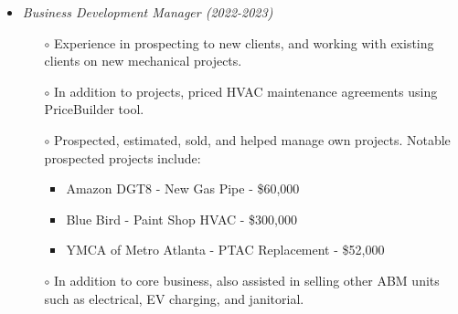 \documentclass[margin]{res}
\begin{document}
\begin{resume}
\begin{itemize}
\begin{itemize}
      \end{itemize}
      \item {\sl Business Development Manager (2022-2023)}
      \begin{itemize}
            \item[$\circ$] Experience in prospecting to new clients, and working with existing clients on new mechanical projects.
            \item[$\circ$] In addition to projects, priced HVAC maintenance agreements using PriceBuilder tool.
            \item[$\circ$] Prospected, estimated, sold, and helped manage own projects. Notable prospected projects include:
              \begin{itemize}
                \item Amazon DGT8 - New Gas Pipe - \$60,000
                \item Blue Bird - Paint Shop HVAC - \$300,000
                \item YMCA of Metro Atlanta - PTAC Replacement - \$52,000
              \end{itemize}
            \item[$\circ$] In addition to core business, also assisted in selling other ABM units such as electrical, EV charging, and janitorial.  
            \end{itemize}
            \end{itemize}
            

\end{resume}
\end{document}
